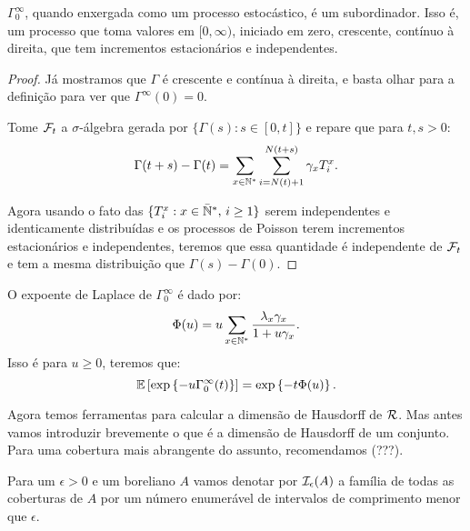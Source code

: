 \begin{proposicao}
  $\Gamma^\infty_0$, quando enxergada como um processo estocástico, é
  um subordinador. Isso é, um processo que toma valores em $[0,
  \infty)$, iniciado em zero, crescente, contínuo à direita, que tem
  incrementos estacionários e independentes.
\end{proposicao}
\begin{proof}

  Já mostramos que $\Gamma$ é crescente e contínua à direita, e basta
  olhar para a definição para ver que $\Gamma^\infty(0) = 0$.

  Tome ${\mathcal{F}}_t$ a $\sigma$-álgebra gerada por $\{ \Gamma(s): s \in [0,
  t]\}$ e repare que para $t, s > 0$:
  \begin{displaymath}
    \Gamma(t+s) - \Gamma(t) = \sum_{x \in {\mathbb{N^*}}} \sum_{i =
      N(t)+1}^{N(t+s)} \gamma_x T_i^x.
  \end{displaymath}

  Agora usando o fato das $\{ T_i^x: x \in {\mathbb{\bar{N}^*}}, \, i \geq 1\}$ serem
  independentes e identicamente distribuídas e os processos de Poisson
  terem incrementos estacionários e independentes, teremos que essa
  quantidade é independente de ${\mathcal{F}}_t$ e tem a mesma distribuição que
  $\Gamma(s) - \Gamma(0)$.
\end{proof}

\begin{proposicao}
  O expoente de Laplace de $\Gamma^\infty_0$ é dado por:
  \begin{displaymath}
    \Phi(u) = u \sum_{x \in {\mathbb{N^*}}} \frac{\lambda_x \gamma_x}{1 + u\gamma_x}.
  \end{displaymath}
  Isso é para $u \geq 0$, teremos que:
  \begin{displaymath}
    {\mathbb{E}} \left[
      \exp \left\{
        -u \Gamma^\infty_0 (t)
      \right\}
    \right] = 
    \exp\left\{
      -t \Phi(u)
    \right\}.
  \end{displaymath}
\end{proposicao}


Agora temos ferramentas para calcular a dimensão de Hausdorff de
${\mathcal{R}}$. Mas antes vamos introduzir brevemente o que é a dimensão de
Hausdorff de um conjunto. Para uma cobertura mais abrangente do
assunto, recomendamos (???).

Para um $\epsilon > 0$ e um boreliano $A$ vamos denotar por
${\mathcal{I}}_\epsilon(A)$ a família de todas as coberturas de $A$ por um
número enumerável de intervalos de comprimento menor que $\epsilon$.


